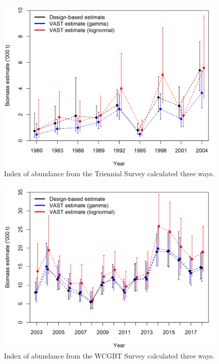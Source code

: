 \documentclass[12pt,]{article}
\begin{document}
\begin{figure}
\centering
\includegraphics{Figures/Triennial_index_compare.png}
\caption{Index of abundance from the Triennial Survey calculated three
ways.\label{fig:Triennial_index_compare}}
\end{figure}

\begin{figure}
\centering
\includegraphics{Figures/WCGBTS_index_compare.png}
\caption{Index of abundance from the WCGBT Survey calculated three
ways.\label{fig:WCGBTS_index_compare}}
\end{figure}
\end{document}
